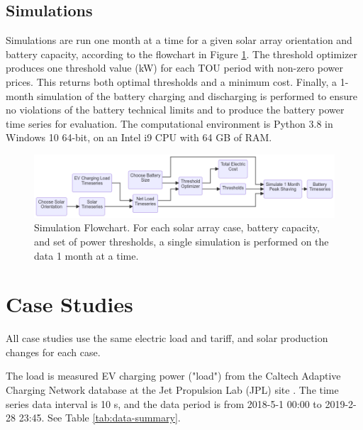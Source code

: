 \documentclass[journal,article,submit,pdftex,moreauthors]{Definitions/mdpi}
\begin{document}
\subsection{Simulations}\label{simulations}%

Simulations are run one month at a time for a given solar array orientation and battery capacity, according to the flowchart in Figure \ref{fig:simulation-flowchart}. The threshold optimizer produces one threshold value (kW) for each TOU period with non-zero power prices. This returns both optimal thresholds and a minimum cost. Finally, a 1-month simulation of the battery charging and discharging is performed to ensure no violations of the battery technical limits and to produce the battery power time series for evaluation. The computational environment is Python 3.8 in Windows 10 64-bit, on an Intel i9 CPU with 64 GB of RAM.

\begin{figure}
  \centering
  \includegraphics[width=\linewidth]{./images/simulation flowchart.png}
  \caption{Simulation Flowchart. For each solar array case, battery capacity, and set of power thresholds, a single simulation is performed on the data 1 month at a time.}
  \label{fig:simulation-flowchart}
\end{figure}

\section{Case Studies}\label{case-studies}%

All case studies use the same electric load and tariff, and solar production changes for each case.

The load is measured EV charging power ("load") from the Caltech Adaptive Charging Network database at the Jet Propulsion Lab (JPL) site \cite{Lee2021}. The time series data interval is 10 s, and the data period is from 2018-5-1 00:00 to 2019-2-28 23:45. See Table \ref{tab:data-summary}.
\end{document}
